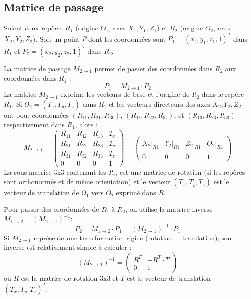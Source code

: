 \documentclass{article}
\begin{document}
\subsection{Matrice de passage}
Soient deux repères $R_1$ (origine $O_1$, axes $X_1, Y_1, Z_1$) et $R_2$ (origine $O_2$, axes $X_2, Y_2, Z_2$). Soit un point $P$ dont les coordonnées sont $P_1 = (x_1, y_1, z_1, 1)^T$ dans $R_1$ et $P_2 = (x_2, y_2, z_2, 1)^T$ dans $R_2$.

La matrice de passage $M_{2 \to 1}$ permet de passer des coordonnées dans $R_2$ aux coordonnées dans $R_1$ :
\[ P_1 = M_{2 \to 1} \cdot P_2 \]
La matrice $M_{2 \to 1}$ exprime les vecteurs de base et l'origine de $R_2$ dans le repère $R_1$. Si $O_2 = (T_x, T_y, T_z)$ dans $R_1$ et les vecteurs directeurs des axes $X_2, Y_2, Z_2$ ont pour coordonnées $(R_{11}, R_{21}, R_{31})$, $(R_{12}, R_{22}, R_{32})$, et $(R_{13}, R_{23}, R_{33})$ respectivement dans $R_1$, alors :
\[
M_{2 \to 1} = \begin{pmatrix}
R_{11} & R_{12} & R_{13} & T_x \\
R_{21} & R_{22} & R_{23} & T_y \\
R_{31} & R_{32} & R_{33} & T_z \\
0 & 0 & 0 & 1
\end{pmatrix} = \begin{pmatrix} & & & \\ X_2|_{R1} & Y_2|_{R1} & Z_2|_{R1} & O_2|_{R1} \\ & & & \\ 0 & 0 & 0 & 1 \end{pmatrix}
\]
La sous-matrice 3x3 contenant les $R_{ij}$ est une matrice de rotation (si les repères sont orthonormés et de même orientation) et le vecteur $(T_x, T_y, T_z)$ est le vecteur de translation de $O_1$ vers $O_2$ exprimé dans $R_1$.

Pour passer des coordonnées de $R_1$ à $R_2$, on utilise la matrice inverse $M_{1 \to 2} = (M_{2 \to 1})^{-1}$:
\[ P_2 = M_{1 \to 2} \cdot P_1 = (M_{2 \to 1})^{-1} \cdot P_1 \]
Si $M_{2 \to 1}$ représente une transformation rigide (rotation + translation), son inverse est relativement simple à calculer :
\[ (M_{2 \to 1})^{-1} = \begin{pmatrix} R^T & -R^T \cdot T \\ 0 & 1 \end{pmatrix} \]
où $R$ est la matrice de rotation 3x3 et $T$ est le vecteur de translation $(T_x, T_y, T_z)^T$.
\end{document}
